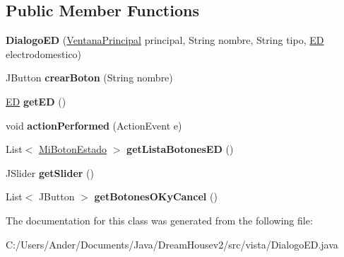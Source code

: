 \subsection*{Public Member Functions}
\begin{DoxyCompactItemize}
\item 
\mbox{\label{classvista_1_1_dialogo_e_d_a7f7115005d0f3f72df01fdaee9edf904}} 
{\bfseries Dialogo\+ED} (\mbox{\hyperlink{classvista_1_1_ventana_principal}{Ventana\+Principal}} principal, String nombre, String tipo, \mbox{\hyperlink{classmodelo_1_1_e_d}{ED}} electrodomestico)
\item 
\mbox{\label{classvista_1_1_dialogo_e_d_a2cc67426758e03db893c7964c5dc3434}} 
J\+Button {\bfseries crear\+Boton} (String nombre)
\item 
\mbox{\label{classvista_1_1_dialogo_e_d_ae87e1a5324565d4fd21215a79cbc4249}} 
\mbox{\hyperlink{classmodelo_1_1_e_d}{ED}} {\bfseries get\+ED} ()
\item 
\mbox{\label{classvista_1_1_dialogo_e_d_a3c72cc5cb5d90ccf816f08fe502836a8}} 
void {\bfseries action\+Performed} (Action\+Event e)
\item 
\mbox{\label{classvista_1_1_dialogo_e_d_aaad8ad855421519227fe64f578dce276}} 
List$<$ \mbox{\hyperlink{classvista_1_1_mi_boton_estado}{Mi\+Boton\+Estado}} $>$ {\bfseries get\+Lista\+Botones\+ED} ()
\item 
\mbox{\label{classvista_1_1_dialogo_e_d_a396d4cbdeee607588ba53cd8ca19fbb0}} 
J\+Slider {\bfseries get\+Slider} ()
\item 
\mbox{\label{classvista_1_1_dialogo_e_d_ad56834c0f0dc975064069e162ea99196}} 
List$<$ J\+Button $>$ {\bfseries get\+Botones\+O\+Ky\+Cancel} ()
\end{DoxyCompactItemize}


The documentation for this class was generated from the following file\+:\begin{DoxyCompactItemize}
\item 
C\+:/\+Users/\+Ander/\+Documents/\+Java/\+Dream\+Housev2/src/vista/Dialogo\+E\+D.\+java\end{DoxyCompactItemize}
